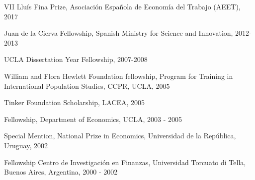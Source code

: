 \documentclass[12pt]{article}
\newlength{\spacebox}
\newcommand{\sepspace}{\vspace*{1em}}		%
\newcommand{\NewPart}[1]{ \vspace*{0.4cm} \noindent \large \textbf{#1}
\par \normalsize \normalfont \vspace*{-0.5cm} \noindent\rule{\textwidth}{1.8pt} \vspace*{-0.75cm} }
\newcommand{\PersonalEntry}[2]{
		\noindent\hangindent=0em\hangafter=0 %
		\parbox{\spacebox}{        %
		\textit{#1}}		       %
		\hspace{1.5em} #2 \par}    %
\newcommand{\SkillsEntry}[2]{      %
		\noindent\hangindent=2em\hangafter=0 %
		\parbox{\spacebox}{        %
		\textit{#1}}			   %
		\hspace{1.5em} #2 \par}    %
\newcommand{\ConferenceEntry}[2]{
		\noindent
		#1		   %
		\hspace{0em} #2 \par}     %
\begin{document}
\ConferenceEntry{VII Lluís Fina Prize, Asociación Española de Economía del Trabajo (AEET), 2017}

\ConferenceEntry{Juan de la Cierva Fellowship, Spanish Ministry for Science and Innovation, 2012-2013}

\ConferenceEntry{UCLA Dissertation Year Fellowship, 2007-2008}{}{}

\ConferenceEntry{William and Flora Hewlett Foundation fellowship, Program for Training in International Population Studies, CCPR, UCLA, 2005}{}{}

\ConferenceEntry{Tinker Foundation Scholarship, LACEA, 2005}{}{}

\ConferenceEntry{Fellowship, Department of Economics, UCLA, 2003 - 2005}{}{}

\ConferenceEntry{Special Mention, National Prize in Economics, Universidad de la República, Uruguay, 2002}{}{}

\ConferenceEntry{Fellowship Centro de Investigación en Finanzas, Universidad Torcuato di Tella, Buenos Aires, Argentina, 2000 - 2002}{}{}


%
%
%
%
%
%
%
%
%



\end{document}
